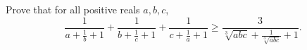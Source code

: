 Prove that for all positive reals $a,b,c$,
\[\frac{1}{a+\frac{1}{b}+1}+\frac{1}{b+\frac{1}{c}+1}+\frac{1}{c+\frac{1}{a}+1}\ge \frac{3}{\sqrt[3]{abc}+\frac{1}{\sqrt[3]{abc}}+1}. \]